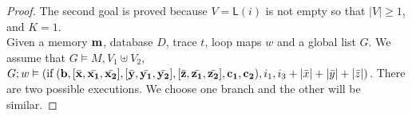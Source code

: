 \begin{proof}
The second goal is proved because $V= \mathsf{L}(i)$ is not empty so that $|V|\geq 1 $, and $K=1$. \\

Given a memory ${\bf{{m}}}$, database $D$, trace $t$, loop maps $w$ and a global list $G$. We assume that $G \vDash M, V_1 \uplus V_2$, $G;w \vDash (\mbox{if\;}({\bf{{b}}},[ \bar{{\bf{{x}}}}, \bar{{\bf{{x_1}}}}, \bar{{\bf{{x_2}}}}] ,[ \bar{{\bf{{y}}}}, \bar{{\bf{{y_1}}}}, \bar{{\bf{{y_2}}}}] , [ \bar{{\bf{{z}}}}, \bar{{\bf{{z_1}}}}, \bar{{\bf{{z_2}}}}] , {\bf{{ c_1, c_2)}}},i_1, i_3+|\bar{x}|+|\bar{y}|+|\bar{z}| ) $.  There are two possible executions. We choose one branch and the other will be similar. 


\end{proof}
